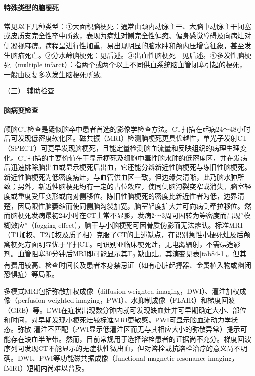 \paragraph{特殊类型的脑梗死}

常见以下几种类型：①大面积脑梗死：通常由颈内动脉主干、大脑中动脉主干闭塞或皮质支完全性卒中所致，表现为病灶对侧完全性偏瘫、偏身感觉障碍及向病灶对侧凝视麻痹。病程呈进行性加重，易出现明显的脑水肿和颅内压增高征象，甚至发生脑疝死亡。②分水岭脑梗死：见后述。③出血性脑梗死：见后述。④多发性脑梗死（multiple
infarct）：指两个或两个以上不同供血系统脑血管闭塞引起的梗死，一般由反复多次发生脑梗死所致。

\hypertarget{text00242.htmlux5cux23CHP8-1-2-2-1-3}{}
（三） 辅助检查

\paragraph{脑病变检查}

颅脑CT检查是疑似脑卒中患者首选的影像学检查方法。CT扫描在起病24～48小时后可发现低密度软化区。磁共振（MRI）检测脑梗死更具优越性，单光子发射CT（SPECT）可更早发现脑梗死，且能定量检测脑血流量和反映组织的病理生理变化。CT扫描的主要价值在于显示梗死及细胞中毒性脑水肿的低密度区，并在发病后迅速排除脑出血或显示梗死后出血，它还能分辨新近性脑梗死与陈旧性脑梗死。新近性脑梗死为低密度病灶，与血管供血区一致，但边缘欠清晰，此乃脑水肿所致；另外，新近性脑梗死均有一定的占位效应，使同侧脑沟裂变窄或消失，脑室轻度或重度受压变形或向对侧移位。陈旧性脑梗死的密度比新近性者为低，边界清楚，因局限性脑萎缩而使同侧脑沟裂加宽，脑室轻度扩大并可向病侧牵拉移位。然而脑梗死发病最初24小时在CT上常不显影，发病2～3周可因转为等密度而出现“模糊效应”（fogging
effect），脑干与小脑梗死可因骨质伪影而无法辨认。标准MRI（T1加权、T2加权及质子相）克服了CT的上述缺点，在识别急性小梗死灶及后颅窝梗死方面明显优于平扫CT。可识别亚临床梗死灶，无电离辐射，不需碘造影剂。血管阻塞30分钟后MRI即可能显示其T\textsubscript{2}
缺血灶。其演变见表\ref{tab84-1}。但其有费用较高、检查时间长及患者本身禁忌证（如有心脏起搏器、金属植入物或幽闭恐惧症）等局限。

多模式MRI包括弥散加权成像（diffusion-weighted
imaging，DWI）、灌注加权成像（perfusion-weighted
imaging，PWI）、水抑制成像（FLAIR）和梯度回波（GRE）等。DWI在症状出现数分钟内就可发现缺血灶并可早期确定大小、部位和时间，对早期发现小梗死灶较标准MRI更敏感。PWI可显示脑血流动力学状态。弥散-灌注不匹配（PWI显示低灌注区而无与其相应大小的弥散异常）提示可能存在缺血半暗带。然而，目前常规用于选择溶栓患者的证据尚不充分。梯度回波序列可发现CT不能显示的无症状性微出血，但对溶栓或抗溶栓治疗的意义尚不明确。DWI、PWI等功能磁共振成像（functional
magnetic resonance imaging，fMRI）短期内尚难以普及。

